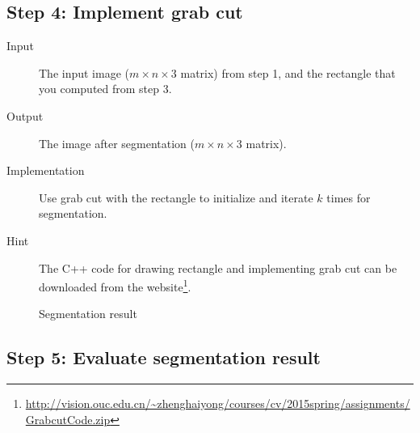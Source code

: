 \documentclass[12pt]{article}
\begin{document}
\subsection{Step 4: Implement grab cut}

\begin{description}
\item[Input] The input image ($m \times n \times 3$ matrix) from step 1, and the rectangle that you computed from step 3.
\item[Output] The image after segmentation ($m \times n \times 3$ matrix).
\item[Implementation] Use grab cut with the rectangle to initialize and iterate $k$ {\color{blue} times} for segmentation.
\item[Hint] The C++ code for drawing rectangle and implementing grab cut can be downloaded from the website\footnote{\url{http://vision.ouc.edu.cn/~zhenghaiyong/courses/cv/2015spring/assignments/GrabcutCode.zip}}.
\end{description}

\begin{figure}[!ht]
  \caption{Segmentation result}
  \label{fig: } %
\end{figure}


\subsection{Step 5: Evaluate segmentation result}
\end{document}
